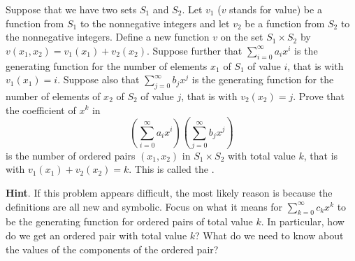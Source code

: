 \documentclass{book}
\begin{document}
\setcounter{cpjt}{249}
\addtocounter{cpjt}{-1}
\begin{activity}\label{ProductPrincipleOGF}
\hypertarget{p-1298}{}%
Suppose that we have two sets \(S_1\) and \(S_2\). Let \(v_1\) (\(v\) stands for value) be a function from \(S_1\) to the nonnegative integers and let \(v_2\) be a function from \(S_2\) to the nonnegative integers.  Define a new function \(v\) on the set \(S_1 \times S_2\) by \(v(x_1,x_2) = v_1(x_1) +v_2(x_2)\). Suppose further that \(\sum_{i=0}^\infty a_ix^i\) is the generating function for the number of elements \(x_1\) of \(S_1\) of value \(i\), that is with \(v_1(x_1)=i\). Suppose also that \(\sum_{j=0}^\infty b_j x^j\) is the generating function for the number of elements of \(x_2\) of \(S_2\) of value \(j\), that is with \(v_2(x_2) = j\).  Prove that the coefficient of \(x^k\) in%
\begin{equation*}
\left(\sum_{i=0}^\infty a_ix^i\right)\left(\sum_{j=0}^\infty
b_jx^j\right)
\end{equation*}
is the number of ordered pairs \((x_1,x_2)\) in \(S_1\times S_2\) with total value \(k\), that is with \(v_1(x_1) +v_2(x_2) =k\). This is called the .%
\par\smallskip%
\noindent\textbf{Hint}.\hypertarget{hint-158}{}\quad%
\hypertarget{p-1299}{}%
If this problem appears difficult, the most likely reason is because the definitions are all new and symbolic. Focus on what it means for \(\sum_{k=0}^\infty c_kx^k\) to be the generating function for ordered pairs of total value \(k\). In particular, how do we get an ordered pair with total value \(k\)? What do we need to know about the values of the components of the ordered pair?%
\par\smallskip%
\noindent\end{activity}

\clearpage
\end{document}
